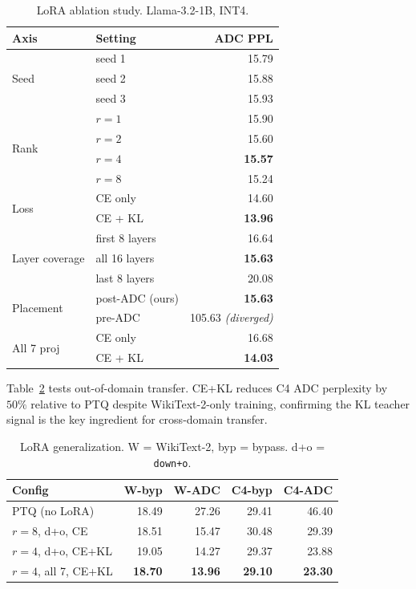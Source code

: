 \documentclass[letterpaper]{article} %
\theoremstyle{plain}
\begin{document}
\begin{table}[htbp]
\centering
\begin{tabular}{@{}llr@{}}
\toprule
\textbf{Axis} & \textbf{Setting} & \textbf{ADC PPL} \\
\midrule
\multirow{3}{*}{Seed}
  & seed 1 & 15.79 \\
  & seed 2 & 15.88 \\
  & seed 3 & 15.93 \\
\midrule
\multirow{4}{*}{Rank}
  & $r=1$ & 15.90 \\
  & $r=2$ & 15.60 \\
  & $r=4$ & \textbf{15.57} \\
  & $r=8$ & 15.24 \\
\midrule
\multirow{2}{*}{Loss}
  & CE only        & 14.60 \\
  & CE + KL        & \textbf{13.96} \\
\midrule
\multirow{3}{*}{Layer coverage}
  & first 8 layers & 16.64 \\
  & all 16 layers  & \textbf{15.63} \\
  & last 8 layers  & 20.08 \\
\midrule
\multirow{2}{*}{Placement}
  & post-ADC (ours) & \textbf{15.63} \\
  & pre-ADC         & 105.63 \textit{(diverged)} \\
\midrule
\multirow{2}{*}{All 7 proj}
  & CE only   & 16.68 \\
  & CE + KL   & \textbf{14.03} \\
\bottomrule
\end{tabular}
\caption{LoRA ablation study. Llama-3.2-1B, INT4.}
\label{tab:lorav7}
\end{table}

Table~\ref{tab:lorav8} tests out-of-domain transfer. CE+KL reduces C4 ADC perplexity by $50\%$ relative to PTQ despite WikiText-2-only training, confirming the KL teacher signal is the key ingredient for cross-domain transfer.

\begin{table}[htbp]
\centering
\setlength{\tabcolsep}{3pt}
\begin{tabular}{@{}lrrrr@{}}
\toprule
\textbf{Config} & \textbf{W-byp} & \textbf{W-ADC} & \textbf{C4-byp} & \textbf{C4-ADC} \\
\midrule
PTQ (no LoRA)              & 18.49 & 27.26 & 29.41 & 46.40 \\
$r{=}8$, d+o, CE           & 18.51 & 15.47 & 30.48 & 29.39 \\
$r{=}4$, d+o, CE+KL        & 19.05 & 14.27 & 29.37 & 23.88 \\
$r{=}4$, all 7, CE+KL      & \textbf{18.70} & \textbf{13.96} & \textbf{29.10} & \textbf{23.30} \\
\bottomrule
\end{tabular}
\caption{LoRA generalization. W = WikiText-2, byp = bypass. d+o = \texttt{down+o}.}
\label{tab:lorav8}
\end{table}
\end{document}
